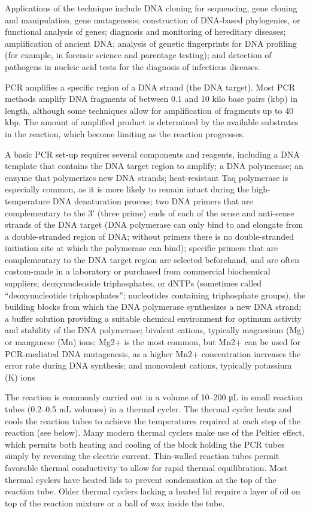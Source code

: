 Applications of the technique include DNA cloning for sequencing, gene cloning and manipulation, gene mutagenesis; construction of DNA-based phylogenies, or functional analysis of genes; diagnosis and monitoring of hereditary diseases; amplification of ancient DNA; analysis of genetic fingerprints for DNA profiling (for example, in forensic science and parentage testing); and detection of pathogens in nucleic acid tests for the diagnosis of infectious diseases.

PCR amplifies a specific region of a DNA strand (the DNA target). Most PCR methods amplify DNA fragments of between 0.1 and 10 kilo base pairs (kbp) in length, although some techniques allow for amplification of fragments up to 40 kbp. The amount of amplified product is determined by the available substrates in the reaction, which become limiting as the reaction progresses.

A basic PCR set-up requires several components and reagents, including a DNA template that contains the DNA target region to amplify; a DNA polymerase; an enzyme that polymerizes new DNA strands; heat-resistant Taq polymerase is especially common, as it is more likely to remain intact during the high-temperature DNA denaturation process; two DNA primers that are complementary to the 3' (three prime) ends of each of the sense and anti-sense strands of the DNA target (DNA polymerase can only bind to and elongate from a double-stranded region of DNA; without primers there is no double-stranded initiation site at which the polymerase can bind); specific primers that are complementary to the DNA target region are selected beforehand, and are often custom-made in a laboratory or purchased from commercial biochemical suppliers; deoxynucleoside triphosphates, or dNTPs (sometimes called ``deoxynucleotide triphosphates''; nucleotides containing triphosphate groups), the building blocks from which the DNA polymerase synthesizes a new DNA strand; a buffer solution providing a suitable chemical environment for optimum activity and stability of the DNA polymerase; bivalent cations, typically magnesium (Mg) or manganese (Mn) ions; Mg2+ is the most common, but Mn2+ can be used for PCR-mediated DNA mutagenesis, as a higher Mn2+ concentration increases the error rate during DNA synthesis; and monovalent cations, typically potassium (K) ions

The reaction is commonly carried out in a volume of 10--200 μL in small reaction tubes (0.2--0.5 mL volumes) in a thermal cycler. The thermal cycler heats and cools the reaction tubes to achieve the temperatures required at each step of the reaction (see below). Many modern thermal cyclers make use of the Peltier effect, which permits both heating and cooling of the block holding the PCR tubes simply by reversing the electric current. Thin-walled reaction tubes permit favorable thermal conductivity to allow for rapid thermal equilibration. Most thermal cyclers have heated lids to prevent condensation at the top of the reaction tube. Older thermal cyclers lacking a heated lid require a layer of oil on top of the reaction mixture or a ball of wax inside the tube.

